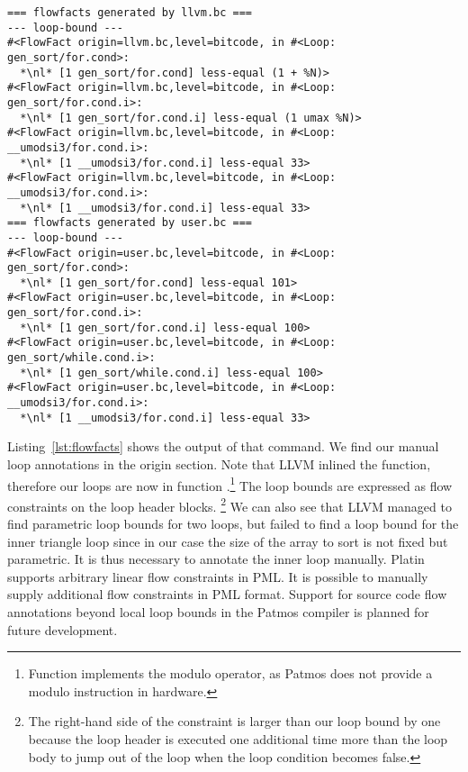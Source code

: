 \lstset{escapechar=*}
\newcommand{\nl}{\raisebox{0ex}[0ex][0ex]{\ensuremath{\hookrightarrow}}}
\begin{lstlisting}[float=t,caption={Flow facts from LLVM and user annotations as reported by \code{platin}},label=lst:flowfacts]
=== flowfacts generated by llvm.bc ===
--- loop-bound ---
#<FlowFact origin=llvm.bc,level=bitcode, in #<Loop: gen_sort/for.cond>:
  *\nl* [1 gen_sort/for.cond] less-equal (1 + %N)>
#<FlowFact origin=llvm.bc,level=bitcode, in #<Loop: gen_sort/for.cond.i>:
  *\nl* [1 gen_sort/for.cond.i] less-equal (1 umax %N)>
#<FlowFact origin=llvm.bc,level=bitcode, in #<Loop: __umodsi3/for.cond.i>:
  *\nl* [1 __umodsi3/for.cond.i] less-equal 33>
#<FlowFact origin=llvm.bc,level=bitcode, in #<Loop: __umodsi3/for.cond.i>:
  *\nl* [1 __umodsi3/for.cond.i] less-equal 33>
=== flowfacts generated by user.bc ===
--- loop-bound ---
#<FlowFact origin=user.bc,level=bitcode, in #<Loop: gen_sort/for.cond>:
  *\nl* [1 gen_sort/for.cond] less-equal 101>
#<FlowFact origin=user.bc,level=bitcode, in #<Loop: gen_sort/for.cond.i>:
  *\nl* [1 gen_sort/for.cond.i] less-equal 100>
#<FlowFact origin=user.bc,level=bitcode, in #<Loop: gen_sort/while.cond.i>:
  *\nl* [1 gen_sort/while.cond.i] less-equal 100>
#<FlowFact origin=user.bc,level=bitcode, in #<Loop: __umodsi3/for.cond.i>:
  *\nl* [1 __umodsi3/for.cond.i] less-equal 33>
\end{lstlisting}

Listing~\ref{lst:flowfacts} shows the output of that command. We find our manual loop annotations in the
 origin section. Note that LLVM inlined the  function, therefore our loops
are now in function .\footnote{Function  implements the modulo operator, as
Patmos does not provide a modulo instruction in hardware.}
The loop bounds are expressed as flow constraints on the loop header blocks.%
\footnote{The right-hand side of the constraint is larger than our loop bound by one because the loop header
is executed one additional time more than the loop body to jump out of the loop when the loop condition becomes false.}
%
We can also see that LLVM managed to find parametric loop bounds for two loops, but failed to find a loop bound for the
inner triangle loop since in our case the size of the array to sort is not fixed but parametric. It is thus necessary
to annotate the inner loop manually.
%
Platin supports arbitrary linear flow constraints in PML. It is possible to manually supply additional flow constraints
in PML format.
Support for source code flow annotations beyond local loop bounds in the Patmos compiler is planned for future development.

